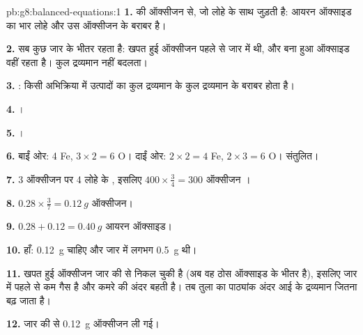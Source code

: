 \begin{solution}{pb:g8:balanced-equations:1}
\textbf{1.}  की ऑक्सीजन से, जो लोहे के साथ जुड़ती है:
आयरन ऑक्साइड का भार लोहे और उस ऑक्सीजन के बराबर है।

\textbf{2.} सब कुछ जार के भीतर रहता है: खपत हुई ऑक्सीजन पहले से जार में थी,
और बना हुआ ऑक्साइड वहीं रहता है। कुल द्रव्यमान नहीं
बदलता।

\textbf{3.} : किसी अभिक्रिया में उत्पादों का कुल द्रव्यमान
 के कुल द्रव्यमान के बराबर होता है।

\textbf{4.} ।

\textbf{5.} ।

\textbf{6.} बाईं ओर: 4 Fe, $3 \times 2 = 6$ O। दाईं ओर: $2 \times 2 = 4$ Fe,
$2 \times 3 = 6$ O। संतुलित।

\textbf{7.} 3 ऑक्सीजन  पर 4 लोहे के , इसलिए $400 \times
\frac{3}{4} = 300$ ऑक्सीजन ।

\textbf{8.} $0.28 \times \frac{3}{7} = \qty{0.12}{g}$ ऑक्सीजन।

\textbf{9.} $0.28 + 0.12 = \qty{0.40}{g}$ आयरन ऑक्साइड।

\textbf{10.} हाँ: \qty{0.12}{g} चाहिए और जार में लगभग
\qty{0.5}{g} थी।

\textbf{11.} खपत हुई ऑक्सीजन जार की  से निकल चुकी है (अब वह ठोस
ऑक्साइड के भीतर है), इसलिए जार में पहले से कम गैस है और कमरे की  अंदर
बहती है। तब तुला का पाठ्यांक अंदर आई  के द्रव्यमान जितना
बढ़ जाता है।

\textbf{12.} जार की  से \qty{0.12}{g} ऑक्सीजन ली गई।
\end{solution}
